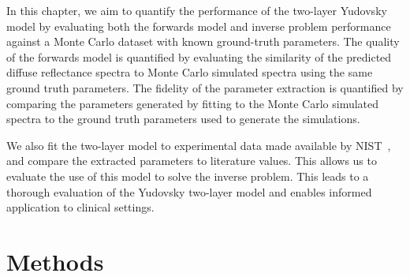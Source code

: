 In this chapter, we aim to quantify the performance of the two-layer Yudovsky model by evaluating both the forwards model and inverse problem performance against a Monte Carlo dataset with known ground-truth parameters. The quality of the forwards model is quantified by evaluating the similarity of the predicted diffuse reflectance spectra to Monte Carlo simulated spectra using the same ground truth parameters. The fidelity of the parameter extraction is quantified by comparing the parameters generated by fitting to the Monte Carlo simulated spectra to the ground truth parameters used to generate the simulations.

We also fit the two-layer model to experimental data made available by NIST~\cite{Cooksey2017}, and compare the extracted parameters to literature values. This allows us to evaluate the use of this model to solve the inverse problem.
This leads to a thorough evaluation of the Yudovsky two-layer model and enables informed application to clinical settings. 

\section{Methods}\label{sec:methods2}


